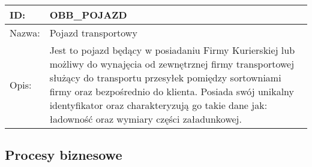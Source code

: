 \begin{center}
\begin{tabular}[h]{|p{1.6cm}|p{13.5cm}|}
\hline
ID: & OBB\_POJAZD \\ \hline
Nazwa: & Pojazd transportowy \\ \hline
Opis: & Jest to pojazd będący w posiadaniu Firmy Kurierskiej lub możliwy do wynajęcia od zewnętrznej firmy transportowej służący do transportu przesyłek pomiędzy sortowniami firmy oraz bezpośrednio do klienta. Posiada swój unikalny identyfikator oraz charakteryzują go takie dane jak: ładowność oraz wymiary części załadunkowej. \\
\hline
\end{tabular}
\end{center}

\subsection{Procesy biznesowe}
